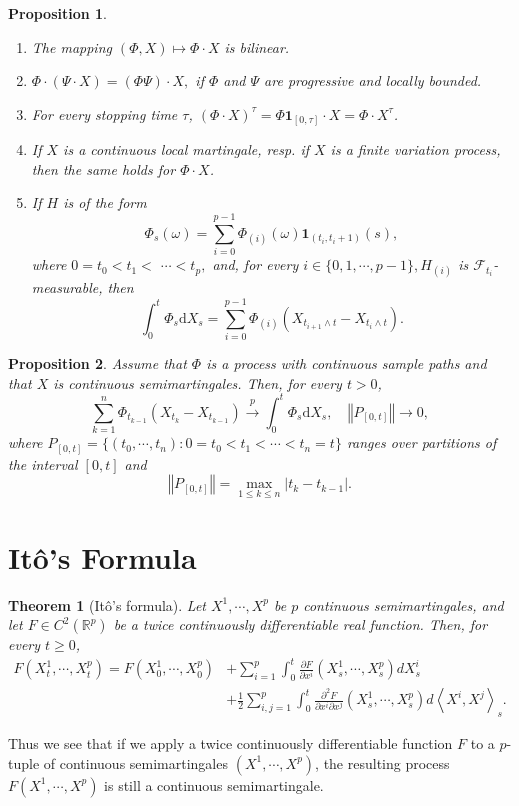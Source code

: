 \documentclass{report}
\newtheorem{proposition}{Proposition}[section]
\newtheorem{theorem}{Theorem}[section]
\theoremstyle{nonumberplain}
\begin{document}
\begin{proposition}
	\begin{enumerate}
		\item The mapping $(\Phi, X) \mapsto \Phi \cdot X$ is bilinear.
		\item $\Phi \cdot(\Psi \cdot X)=(\Phi \Psi) \cdot X,$ if $\Phi$ and $\Psi$ are progressive and locally bounded.
		\item For every stopping time $\tau$, $(\Phi \cdot X)^{\tau}=\Phi \mathbf{1}_{[0, \tau]} \cdot X=\Phi \cdot X^{\tau}$.
		\item If $X$ is a continuous local martingale, resp. if $X$ is a finite variation process, then the same holds for $\Phi \cdot X$.
		\item If $H$ is of the form 
		$$
		\Phi_{s}(\omega)=\sum_{i=0}^{p-1} \Phi_{(i)}(\omega) \mathbf{1}_{\left(t_{i}, t_{i}+1\right)}(s),
		$$
		where $0=t_{0}<t_{1}<$
		$\cdots<t_{p},$ and, for every $i \in\{0,1, \cdots, p-1\}, H_{(i)}$ is $\mathcal{F}_{t_{i}}$-measurable, then
		\[
		\int_{0}^{t} \Phi_{s} \mathrm{d} X_{s}=\sum_{i=0}^{p-1} \Phi_{(i)}\left(X_{t_{i+1} \wedge t}-X_{t_{i} \wedge t}\right).
		\]
	\end{enumerate}
\end{proposition}


\begin{proposition}
	Assume that $\Phi$ is a process with continuous sample paths and that $X$ is continuous semimartingales. Then, for every $t>0$,
	\[
	\sum_{k=1}^{n} \Phi_{t_{k-1}}\left(X_{t_{k}}-X_{t_{k-1}}\right)\stackrel{p}{\longrightarrow}\int_{0}^{t} \Phi_{s} \mathrm{d} X_{s},\quad\left\Vert P_{[0,t]}\right\Vert \longrightarrow 0,
	\]
	where $P_{[0,t]}=\{(t_0,\cdots,t_n):0=t_0<t_1<\cdots<t_n=t\}$ ranges over partitions of the interval $[0,t]$ and 
	\[
	\left\Vert P_{[0,t]}\right\Vert=\max\limits_{1\le k\le n}{|t_k-t_{k-1}|}.
	\]
\end{proposition}

\section{Itô's Formula}
\begin{theorem}[Itô's formula]
	Let $X^{1}, \cdots, X^{p}$ be $p$ continuous semimartingales, and let $F\in C^2(\mathbb{R}^{p})$ be a twice continuously differentiable real function. Then, for every $t \geq 0$,
	\begin{align}
		F\left(X_{t}^{1}, \cdots, X_{t}^{p}\right)=F\left(X_{0}^{1}, \cdots, X_{0}^{p}\right) &+\sum_{i=1}^{p} \int_{0}^{t} \frac{\partial F}{\partial x^{i}}\left(X_{s}^{1}, \cdots, X_{s}^{p}\right) d X_{s}^{i} \nonumber\\
		&+\frac{1}{2} \sum_{i, j=1}^{p} \int_{0}^{t} \frac{\partial^{2} F}{\partial x^{i} \partial x^{j}}\left(X_{s}^{1}, \cdots, X_{s}^{p}\right) d\left\langle X^{i}, X^{j}\right\rangle_{s}.\label{ito}
	\end{align}
\end{theorem}
Thus we see that if we apply a twice continuously differentiable function $F$ to a $p$-tuple of continuous semimartingales $(X^{1}, \cdots, X^{p})$, the resulting process $F(X^{1}, \cdots, X^{p})$ is still a continuous semimartingale.
\end{document}
